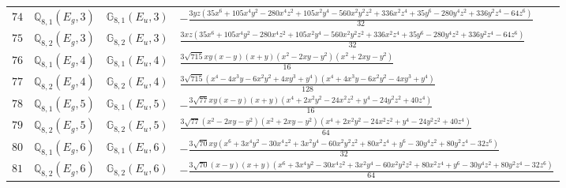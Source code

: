 \documentclass[fleqn,8pt,landscape]{jsarticle}
\begin{document}
\begin{table}[ht!]
\begin{center}
\begin{tabular}{cccl}
$ 74 $ & $ \mathbb{Q}_{8,1}(E_{g},3) $ & $ \mathbb{G}_{8,1}(E_{u},3) $ & $ - \frac{3 y z \left(35 x^{6} + 105 x^{4} y^{2} - 280 x^{4} z^{2} + 105 x^{2} y^{4} - 560 x^{2} y^{2} z^{2} + 336 x^{2} z^{4} + 35 y^{6} - 280 y^{4} z^{2} + 336 y^{2} z^{4} - 64 z^{6}\right)}{32} $ \\
$ 75 $ & $ \mathbb{Q}_{8,2}(E_{g},3) $ & $ \mathbb{G}_{8,2}(E_{u},3) $ & $ \frac{3 x z \left(35 x^{6} + 105 x^{4} y^{2} - 280 x^{4} z^{2} + 105 x^{2} y^{4} - 560 x^{2} y^{2} z^{2} + 336 x^{2} z^{4} + 35 y^{6} - 280 y^{4} z^{2} + 336 y^{2} z^{4} - 64 z^{6}\right)}{32} $ \\
$ 76 $ & $ \mathbb{Q}_{8,1}(E_{g},4) $ & $ \mathbb{G}_{8,1}(E_{u},4) $ & $ \frac{3 \sqrt{715} x y \left(x - y\right) \left(x + y\right) \left(x^{2} - 2 x y - y^{2}\right) \left(x^{2} + 2 x y - y^{2}\right)}{16} $ \\
$ 77 $ & $ \mathbb{Q}_{8,2}(E_{g},4) $ & $ \mathbb{G}_{8,2}(E_{u},4) $ & $ \frac{3 \sqrt{715} \left(x^{4} - 4 x^{3} y - 6 x^{2} y^{2} + 4 x y^{3} + y^{4}\right) \left(x^{4} + 4 x^{3} y - 6 x^{2} y^{2} - 4 x y^{3} + y^{4}\right)}{128} $ \\
$ 78 $ & $ \mathbb{Q}_{8,1}(E_{g},5) $ & $ \mathbb{G}_{8,1}(E_{u},5) $ & $ - \frac{3 \sqrt{77} x y \left(x - y\right) \left(x + y\right) \left(x^{4} + 2 x^{2} y^{2} - 24 x^{2} z^{2} + y^{4} - 24 y^{2} z^{2} + 40 z^{4}\right)}{16} $ \\
$ 79 $ & $ \mathbb{Q}_{8,2}(E_{g},5) $ & $ \mathbb{G}_{8,2}(E_{u},5) $ & $ \frac{3 \sqrt{77} \left(x^{2} - 2 x y - y^{2}\right) \left(x^{2} + 2 x y - y^{2}\right) \left(x^{4} + 2 x^{2} y^{2} - 24 x^{2} z^{2} + y^{4} - 24 y^{2} z^{2} + 40 z^{4}\right)}{64} $ \\
$ 80 $ & $ \mathbb{Q}_{8,1}(E_{g},6) $ & $ \mathbb{G}_{8,1}(E_{u},6) $ & $ - \frac{3 \sqrt{70} x y \left(x^{6} + 3 x^{4} y^{2} - 30 x^{4} z^{2} + 3 x^{2} y^{4} - 60 x^{2} y^{2} z^{2} + 80 x^{2} z^{4} + y^{6} - 30 y^{4} z^{2} + 80 y^{2} z^{4} - 32 z^{6}\right)}{32} $ \\
$ 81 $ & $ \mathbb{Q}_{8,2}(E_{g},6) $ & $ \mathbb{G}_{8,2}(E_{u},6) $ & $ - \frac{3 \sqrt{70} \left(x - y\right) \left(x + y\right) \left(x^{6} + 3 x^{4} y^{2} - 30 x^{4} z^{2} + 3 x^{2} y^{4} - 60 x^{2} y^{2} z^{2} + 80 x^{2} z^{4} + y^{6} - 30 y^{4} z^{2} + 80 y^{2} z^{4} - 32 z^{6}\right)}{64} $ \\
 \hline \hline
\end{tabular}
\end{center}
\end{table}
\end{document}

